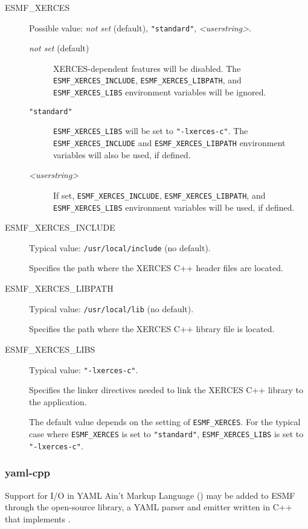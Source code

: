 \begin{description}

\item[ESMF\_XERCES] Possible value: {\it not set} (default), {\tt "standard"},
{\it <userstring>}.

\begin{description}
\item[{\it not set} (default)] XERCES-dependent features will be disabled.
The {\tt ESMF\_XERCES\_INCLUDE}, {\tt ESMF\_XERCES\_LIBPATH}, and
{\tt ESMF\_XERCES\_LIBS} environment variables will be ignored.

\item[{\tt "standard"}] {\tt ESMF\_XERCES\_LIBS} will be set to
{\tt "-lxerces-c"}.  The {\tt ESMF\_XERCES\_INCLUDE} and
{\tt ESMF\_XERCES\_LIBPATH} environment variables will also be used,
if defined.

\item[{\it <userstring>}] If set, {\tt ESMF\_XERCES\_INCLUDE},
{\tt ESMF\_XERCES\_LIBPATH}, and {\tt ESMF\_XERCES\_LIBS} environment
variables will be used, if defined.
\end{description}

\item[ESMF\_XERCES\_INCLUDE] Typical value: {\tt /usr/local/include}
(no default).

Specifies the path where the XERCES C++ header files are located.

\item[ESMF\_XERCES\_LIBPATH] Typical value: {\tt /usr/local/lib} (no default).

Specifies the path where the XERCES C++ library file is located.

\item[ESMF\_XERCES\_LIBS] Typical value: {\tt "-lxerces-c"}.

Specifies the linker directives needed to link the XERCES C++ library to
the application.

The default value depends on the setting of {\tt ESMF\_XERCES}.  For the
typical case where {\tt ESMF\_XERCES} is set to {\tt "standard"},
{\tt ESMF\_XERCES\_LIBS} is set to {\tt "-lxerces-c"}.
\end{description}


\subsubsection{yaml-cpp}
\label{sec:yaml-cpp}
Support for I/O in YAML Ain't Markup Language
()
may be added to ESMF through the open-source
 library,
a YAML parser and emitter written in C++ that implements
.

